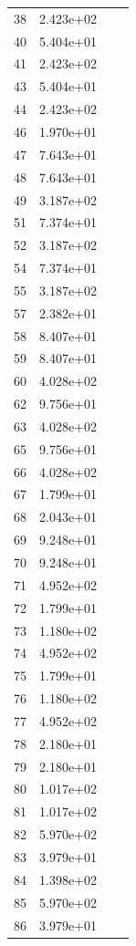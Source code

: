 \documentclass[12pt]{article}
\begin{document}
\begin{longtable}{@{}cccc@{}}
38 & 2.423e+02 &  &  \\
40 & 5.404e+01 &  &  \\
41 & 2.423e+02 &  &  \\
43 & 5.404e+01 &  &  \\
44 & 2.423e+02 &  &  \\
46 & 1.970e+01 &  &  \\
47 & 7.643e+01 &  &  \\
48 & 7.643e+01 &  &  \\
49 & 3.187e+02 &  &  \\
51 & 7.374e+01 &  &  \\
52 & 3.187e+02 &  &  \\
54 & 7.374e+01 &  &  \\
55 & 3.187e+02 &  &  \\
57 & 2.382e+01 &  &  \\
58 & 8.407e+01 &  &  \\
59 & 8.407e+01 &  &  \\
60 & 4.028e+02 &  &  \\
62 & 9.756e+01 &  &  \\
63 & 4.028e+02 &  &  \\
65 & 9.756e+01 &  &  \\
66 & 4.028e+02 &  &  \\
67 & 1.799e+01 &  &  \\
68 & 2.043e+01 &  &  \\
69 & 9.248e+01 &  &  \\
70 & 9.248e+01 &  &  \\
71 & 4.952e+02 &  &  \\
72 & 1.799e+01 &  &  \\
73 & 1.180e+02 &  &  \\
74 & 4.952e+02 &  &  \\
75 & 1.799e+01 &  &  \\
76 & 1.180e+02 &  &  \\
77 & 4.952e+02 &  &  \\
78 & 2.180e+01 &  &  \\
79 & 2.180e+01 &  &  \\
80 & 1.017e+02 &  &  \\
81 & 1.017e+02 &  &  \\
82 & 5.970e+02 &  &  \\
83 & 3.979e+01 &  &  \\
84 & 1.398e+02 &  &  \\
85 & 5.970e+02 &  &  \\
86 & 3.979e+01 &  &  \\

\end{longtable}
\end{document}
